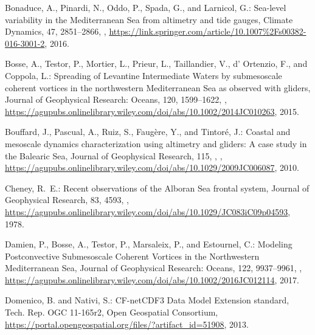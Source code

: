 \documentclass[essd]{copernicus}
\begin{document}
\begin{thebibliography}{46}
Bonaduce, A., Pinardi, N., Oddo, P., Spada, G., and Larnicol, G.: Sea-level
  variability in the Mediterranean Sea from altimetry and tide gauges, Climate
  Dynamics, 47, 2851--2866, ,
  \urlprefix\url{https://link.springer.com/article/10.1007%2Fs00382-016-3001-2},
  2016.

Bosse, A., Testor, P., Mortier, L., Prieur, L., Taillandier, V., d’ Ortenzio,
  F., and Coppola, L.: {Spreading of Levantine Intermediate Waters by
  submesoscale coherent vortices in the northwestern Mediterranean Sea as
  observed with gliders}, Journal of Geophysical Research: Oceans, 120,
  1599–1622, ,
  \urlprefix\url{https://agupubs.onlinelibrary.wiley.com/doi/abs/10.1002/2014JC010263},
  2015.

Bouffard, J., Pascual, A., Ruiz, S., Faug\`{e}re, Y., and Tintor\'{e}, J.:
  {Coastal and mesoscale dynamics characterization using altimetry and gliders:
  A case study in the Balearic Sea}, Journal of Geophysical Research, 115, {},
  ,
  \urlprefix\url{https://agupubs.onlinelibrary.wiley.com/doi/abs/10.1029/2009JC006087},
  2010.

Cheney, R.~E.: {Recent observations of the Alboran Sea frontal system}, Journal
  of Geophysical Research, 83, 4593, ,
  \urlprefix\url{https://agupubs.onlinelibrary.wiley.com/doi/abs/10.1029/JC083iC09p04593},
  1978.

Damien, P., Bosse, A., Testor, P., Marsaleix, P., and Estournel, C.: Modeling
  Postconvective Submesoscale Coherent Vortices in the Northwestern
  Mediterranean Sea, Journal of Geophysical Research: Oceans, 122, 9937–9961,
  ,
  \urlprefix\url{https://agupubs.onlinelibrary.wiley.com/doi/abs/10.1002/2016JC012114},
  2017.

Domenico, B. and Nativi, S.: {CF-netCDF3 Data Model Extension standard}, Tech.
  Rep. {OGC 11-165r2}, Open Geospatial Consortium,
  \urlprefix\url{https://portal.opengeospatial.org/files/?artifact_id=51908},
  2013.


\end{thebibliography}
\end{document}
